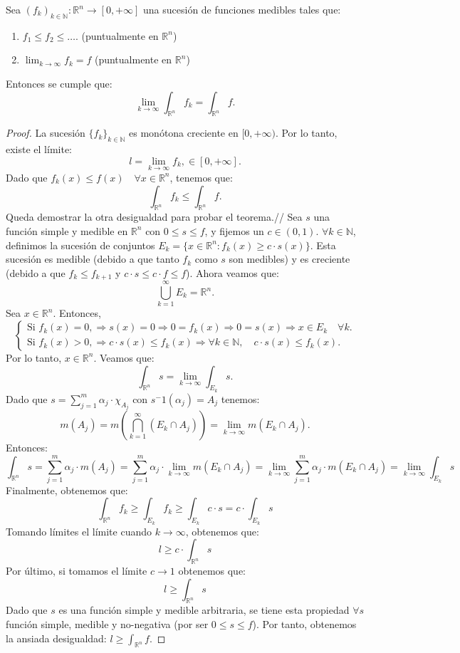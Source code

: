 \begin{teorema}
    Sea $(f_k)_{k \in \mathbb{N}} : \mathbb{R}^n \to [0, +\infty]$ una sucesión de funciones medibles tales que: 
    \begin{enumerate}
        \item $f_1 \leq f_2 \leq \dots$. (puntualmente en $\mathbb{R}^n$)
        \item $\lim_{k \to \infty} f_k = f$ (puntualmente en $\mathbb{R}^n$)
    \end{enumerate}
    Entonces se cumple que: 
    $$\lim_{k \to \infty} \int_{\mathbb{R}^n} f_k = \int_{\mathbb{R}^n} f.$$
\end{teorema}
\begin{proof}
    La sucesión $\{ f_k \}_{k \in \mathbb{N}}$ es monótona creciente en $[0, +\infty)$.  
    Por lo tanto, existe el límite:
    $$ l = \lim\limits_{k \to \infty} f_k, \in [0, +\infty].$$
    Dado que $f_k(x) \leq f(x) \quad \forall x \in \mathbb{R}^n$, tenemos que:
    $$\int_{\mathbb{R}^n} f_k \leq \int_{\mathbb{R}^n} f.$$ Queda demostrar la otra desigualdad para probar el teorema.//
    Sea $s$ una función simple y medible en $\mathbb{R}^n$ con $0 \leq s \leq f$, y fijemos un $c \in (0, 1)$.
    $\forall k \in \mathbb{N}$, definimos la sucesión de conjuntos $E_k = \{ x \in \mathbb{R}^n : f_k(x) \geq c \cdot s(x) \}$. Esta sucesión es medible (debido a que tanto $f_k$ como $s$ son medibles) y es creciente (debido a que $f_k \leq f_{k+1}$ y $c \cdot s \leq c \cdot f \leq f$).
    Ahora veamos que:     
    $$
    \bigcup\limits_{k=1}^{\infty} E_k = \mathbb{R}^n.
    $$
    Sea $x \in \mathbb{R}^n$. Entonces,
    \[
    \begin{cases}
        \text{Si } f_k(x) = 0, \Rightarrow s(x) = 0 \Rightarrow 0 = f_k(x) \Rightarrow 0 = s(x) \Rightarrow x \in E_k \quad \forall k. \\ 
        \text{Si } f_k(x) > 0, \Rightarrow c \cdot s(x) \leq f_k(x) \Rightarrow \forall k \in \mathbb{N}, \quad c \cdot s(x) \leq f_k(x).
    \end{cases}
    \]
    Por lo tanto, $x \in \mathbb{R}^n$.
    Veamos que:
    $$\int_{\mathbb{R}^n} s = \lim\limits_{k \to \infty} \int_{E_k} s.$$
    Dado que $s = \sum_{j=1}^{m} \alpha_j \cdot \chi_{A_j}$ con $s^-1(\alpha_j) = A_j$ tenemos:
    $$ m(A_j) = m(\bigcap_{k = 1}^{\infty}(E_k\cap A_j)) = \lim\limits_{k \to \infty} m(E_k \cap A_j). $$
    Entonces:$$\int_{\mathbb{R}^n} s = \sum_{j=1}^{m} \alpha_j \cdot m(A_j) = \sum_{j=1}^{m} \alpha_j \cdot \lim\limits_{k \to \infty} m(E_k \cap A_j) = \lim\limits_{k \to \infty} \sum_{j=1}^{m} \alpha_j \cdot m(E_k \cap A_j) = \lim\limits_{k \to \infty} \int_{E_k} s$$
    Finalmente, obtenemos que: 
    $$ \int_{\mathbb{R}^n}f_k \geq \int_{E_k} f_k \geq \int_{E_k} c \cdot s = c \cdot \int_{E_k} s$$
    Tomando límites el límite cuando $k \to \infty$, obtenemos que:
    $$ l \geq c \cdot \int_{\mathbb{R}^n} s$$
    Por último, si tomamos el límite $c \to 1$ obtenemos que:
    $$ l \geq \int_{\mathbb{R}^n} s$$ 
    Dado que $s$ es una función simple y medible arbitraria, se tiene esta propiedad $\forall s$ función simple, medible y no-negativa (por ser $0 \leq s \leq f$). Por tanto, obtenemos la ansiada desigualdad: $l \geq \int_{\mathbb{R}^n} f$.
\end{proof}
